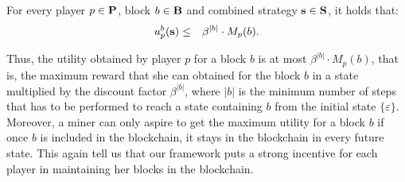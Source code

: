 \begin{myprop}\label{prop-ub-block}
For every player $p \in \bP$, block $b \in \mathbf{B}$ and combined strategy $\bs \in \bS$, it holds that:
\begin{eqnarray*}
u^b_p(\mathbf{s}) & \leq &  \beta^{|b|} \cdot M_p(b).
\end{eqnarray*}
\end{myprop}
Thus, the utility obtained by player $p$ for a block $b$ is at most $\beta^{|b|} \cdot M_p(b)$, that is, the maximum reward that she can obtained for the block $b$ in a state multiplied by the discount factor $\beta^{|b|}$, where $|b|$ is the minimum number of steps that has to be performed to reach a state containing $b$ from the initial state $\{\varepsilon\}$. 
Moreover, a miner can only aspire to get the maximum utility for a block $b$ if once $b$ is included in the blockchain, it stays in the blockchain in every future state. This again tell us that our framework puts a strong incentive for each player in maintaining her blocks in the blockchain.

\iffalse
Given a player $p$ and a combined strategy $\bs$, we have that: 
\begin{eqnarray*}
u_p(\bs \mid \{\varepsilon\})  & =  & \sum_{b \in \bB} u^b_p(\bs \mid \{\varepsilon\}).
\end{eqnarray*}
Therefore, we know from Proposition \ref{prop-ub-block} that the reward of $p$ for a block $b$ is not accumulated more than once in the utility of $p$ for the combined strategy $\bs$. In fact, we obtained as a corollary of Proposition \ref{prop-ub-block} that:
\begin{mycor}\label{cor-ub-ut}
For every player $p \in \bP$ and combined strategy $\bs \in \bS$, it holds that:
\begin{eqnarray*}
u_p(\bs \mid \{\varepsilon\}) & \leq &  \sum_{b \in \bB} \beta^{|b|} \cdot M_p(b).
\end{eqnarray*}
\end{mycor}
\fi



